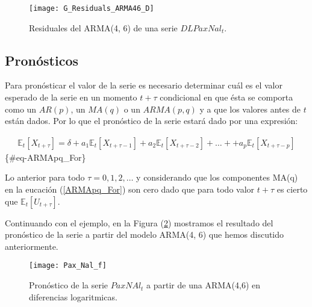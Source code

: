 \documentclass[
  a4paper,
]{article}
\begin{document}
\begin{figure}
  \centering
    \texttt{[image: G\_Residuals\_ARMA46\_D]}
  \caption{Residuales del ARMA(4, 6) de una serie $DLPaxNal_t$.}
  \label{G_Residuals_ARMA46_D}
\end{figure}

\hypertarget{pronuxf3sticos}{%
\subsection{Pronósticos}\label{pronuxf3sticos}}

Para pronósticar el valor de la serie es necesario determinar cuál es el
valor esperado de la serie en un momento \(t + \tau\) condicional en que
ésta se comporta como un \(AR(p)\), un \(MA(q)\) o un \(ARMA(p, q)\) y a
que los valores antes de \(t\) están dados. Por lo que el pronóstico de
la serie estará dado por una expresión:

\begin{eqnarray}
    \mathbb{E}_t[X_{t+\tau}] = \delta + a_1 \mathbb{E}_t[X_{t+\tau-1}] + a_2 \mathbb{E}_t[X_{t+\tau-2}] + \ldots + + a_p \mathbb{E}_t[X_{t+\tau-p}]
\end{eqnarray} \{\#eq-ARMApq\_For\}

Lo anterior para todo \(\tau = 0, 1, 2, \ldots\) y considerando que los
componentes MA(q) en la eucación (\ref{ARMApq_For}) son cero dado que
para todo valor \(t + \tau\) es cierto que \(\mathbb{E}_t[U_{t+\tau}]\).

Continuando con el ejemplo, en la Figura (\ref{Pax_Nal_f}) mostramos el
resultado del pronóstico de la serie a partir del modelo ARMA(4, 6) que
hemos discutido anteriormente.

\begin{figure}
  \centering
    \texttt{[image: Pax\_Nal\_f]}
  \caption{Pronóstico de la serie $PaxNAl_t$ a partir de una ARMA(4,6) en diferencias logaritmicas.}
  \label{Pax_Nal_f}
\end{figure}


\printbibliography
\end{document}
